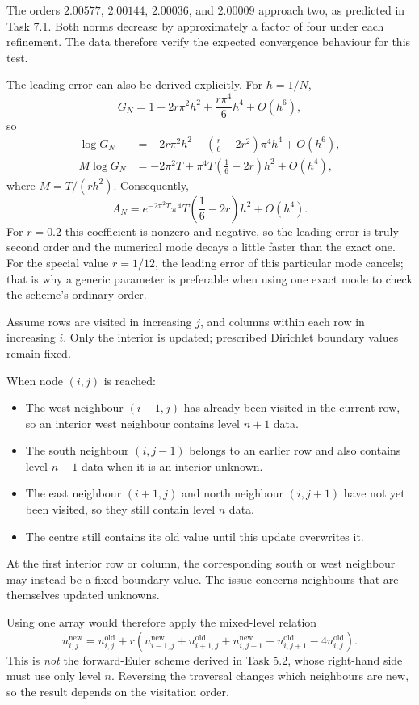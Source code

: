 The orders $2.00577$, $2.00144$, $2.00036$, and $2.00009$ approach two, as predicted in
Task 7.1. Both norms decrease by approximately a factor of four under each refinement.
The data therefore verify the expected convergence behaviour for this test.

The leading error can also be derived explicitly. For $h=1/N$,
\[
G_N=1-2r\pi^2h^2+\frac{r\pi^4}{6}h^4+O(h^6),
\]
so
\begin{align*}
\log G_N
&=-2r\pi^2h^2+\left(\frac r6-2r^2\right)\pi^4h^4+O(h^6),\\
M\log G_N
&=-2\pi^2T+\pi^4T\left(\frac16-2r\right)h^2+O(h^4),
\end{align*}
where $M=T/(rh^2)$. Consequently,
\[
A_N=e^{-2\pi^2T}\pi^4T\left(\frac16-2r\right)h^2+O(h^4).
\]
For $r=0.2$ this coefficient is nonzero and negative, so the leading error is truly second
order and the numerical mode decays a little faster than the exact one. For the special value
$r=1/12$, the leading error of this particular mode cancels; that is why a generic parameter
is preferable when using one exact mode to check the scheme's ordinary order.

Assume rows are visited in increasing $j$, and columns within each row in increasing $i$.
Only the interior is updated; prescribed Dirichlet boundary values remain fixed.

When node $(i,j)$ is reached:
\begin{itemize}
\item The west neighbour $(i-1,j)$ has already been visited in the current row, so an interior
west neighbour contains level $n+1$ data.
\item The south neighbour $(i,j-1)$ belongs to an earlier row and also contains level $n+1$ data
when it is an interior unknown.
\item The east neighbour $(i+1,j)$ and north neighbour $(i,j+1)$ have not yet been visited,
so they still contain level $n$ data.
\item The centre still contains its old value until this update overwrites it.
\end{itemize}
At the first interior row or column, the corresponding south or west neighbour may instead
be a fixed boundary value. The issue concerns neighbours that are themselves updated unknowns.

Using one array would therefore apply the mixed-level relation
\[
u_{i,j}^{\mathrm{new}}=u_{i,j}^{\mathrm{old}}+r\left(
u_{i-1,j}^{\mathrm{new}}+u_{i+1,j}^{\mathrm{old}}
+u_{i,j-1}^{\mathrm{new}}+u_{i,j+1}^{\mathrm{old}}
-4u_{i,j}^{\mathrm{old}}\right).
\]
This is \emph{not} the forward-Euler scheme derived in Task 5.2, whose right-hand side must
use only level $n$. Reversing the traversal changes which neighbours are new, so the result
depends on the visitation order.

